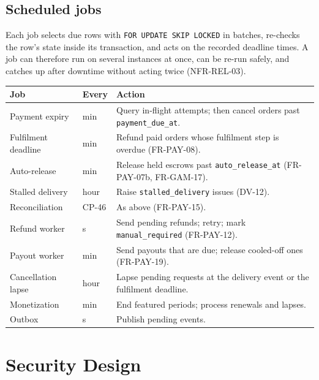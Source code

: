 \documentclass[11pt,a4paper]{article}
\newenvironment{dtable}[1]{\small\begin{longtable}{#1}}{\end{longtable}}
\begin{document}
\subsection{Scheduled jobs}
\label{sec:jobs}
Each job selects due rows with \texttt{FOR UPDATE SKIP LOCKED} in batches, re-checks the row's state inside its transaction, and acts on the recorded deadline times. A job can therefore run on several instances at once, can be re-run safely, and catches up after downtime without acting twice (NFR-REL-03).
\begin{dtable}{@{}>{\raggedright\arraybackslash}p{3.6cm}>{\raggedright\arraybackslash}p{1.8cm}>{\raggedright\arraybackslash}p{9.8cm}@{}}
\toprule
\textbf{Job} & \textbf{Every} & \textbf{Action} \\ \midrule \endhead
Payment expiry & 1 min & Query in-flight attempts; then cancel orders past \texttt{payment\_due\_at}. \\
Fulfilment deadline & 1 min & Refund paid orders whose fulfilment step is overdue (FR-PAY-08). \\
Auto-release & 1 min & Release held escrows past \texttt{auto\_release\_at} (FR-PAY-07b, FR-GAM-17). \\
Stalled delivery & 1 hour & Raise \texttt{stalled\_delivery} issues (DV-12). \\
Reconciliation & CP-46 & As above (FR-PAY-15). \\
Refund worker & 30 s & Send pending refunds; retry; mark \texttt{manual\_required} (FR-PAY-12). \\
Payout worker & 1 min & Send payouts that are due; release cooled-off ones (FR-PAY-19). \\
Cancellation lapse & 1 hour & Lapse pending requests at the delivery event or the fulfilment deadline. \\
Monetization & 5 min & End featured periods; process renewals and lapses. \\
Outbox & 5 s & Publish pending events. \\
\bottomrule
\end{dtable}
\section{Security Design}
\end{document}

